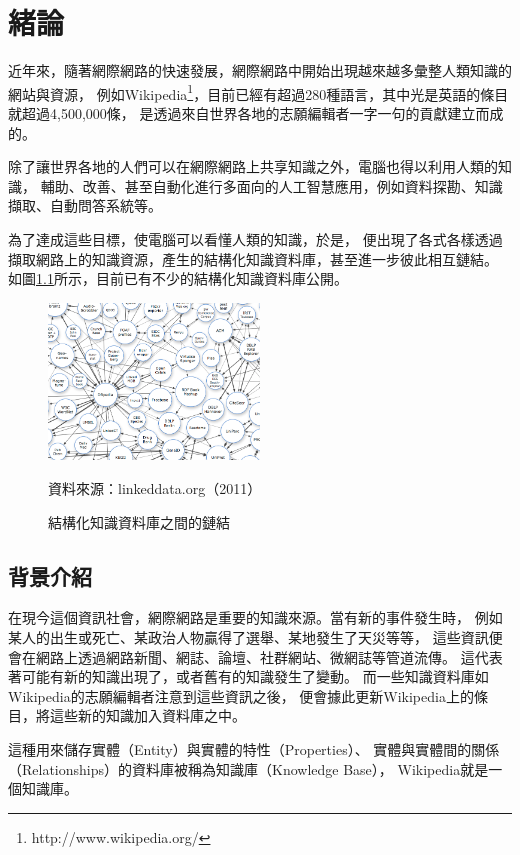 %
%
%
\chapter{緒論}
\label{c:intro}

近年來，隨著網際網路的快速發展，網際網路中開始出現越來越多彙整人類知識的網站與資源，
例如Wikipedia\footnote{http://www.wikipedia.org/}，目前已經有超過280種語言，其中光是英語的條目就超過4,500,000條，
是透過來自世界各地的志願編輯者一字一句的貢獻建立而成的。

除了讓世界各地的人們可以在網際網路上共享知識之外，電腦也得以利用人類的知識，
輔助、改善、甚至自動化進行多面向的人工智慧應用，例如資料探勘、知識擷取、自動問答系統等。

為了達成這些目標，使電腦可以看懂人類的知識，於是，
便出現了各式各樣透過擷取網路上的知識資源，產生的結構化知識資料庫，甚至進一步彼此相互鏈結。
如圖\ref{i:lod}所示，目前已有不少的結構化知識資料庫公開。

\begin{figure}
    \centering
    \includegraphics[width=0.5\textwidth]{images/01-lod-datasets}
    \caption{結構化知識資料庫之間的鏈結}
    \label{i:lod}
    資料來源：linkeddata.org（2011）
\end{figure}

%
%
\section{背景介紹}
在現今這個資訊社會，網際網路是重要的知識來源。當有新的事件發生時，
例如某人的出生或死亡、某政治人物贏得了選舉、某地發生了天災等等，
這些資訊便會在網路上透過網路新聞、網誌、論壇、社群網站、微網誌等管道流傳。
這代表著可能有新的知識出現了，或者舊有的知識發生了變動。
而一些知識資料庫如Wikipedia的志願編輯者注意到這些資訊之後，
便會據此更新Wikipedia上的條目，將這些新的知識加入資料庫之中。

這種用來儲存實體（Entity）與實體的特性（Properties）、
實體與實體間的關係（Relationships）的資料庫被稱為知識庫（Knowledge Base），
Wikipedia就是一個知識庫。

